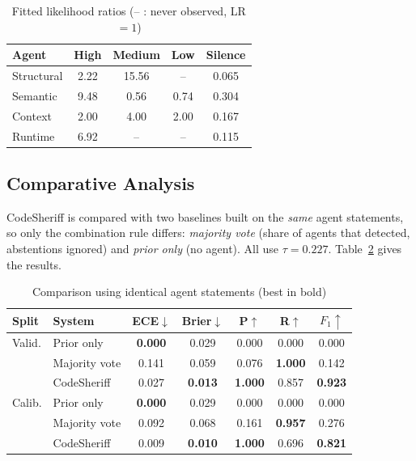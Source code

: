 \documentclass[conference]{IEEEtran}
\begin{document}
\begin{table}[t]
\centering
\caption{Fitted likelihood ratios (-- : never observed, LR $=1$)}
\label{tab:lr}
\small
\setlength{\tabcolsep}{5pt}
\begin{tabular}{lcccc}
\toprule
Agent & High & Medium & Low & Silence \\
\midrule
Structural & 2.22 & 15.56 & --   & 0.065 \\
Semantic   & 9.48 & 0.56  & 0.74 & 0.304 \\
Context    & 2.00 & 4.00  & 2.00 & 0.167 \\
Runtime    & 6.92 & --    & --   & 0.115 \\
\bottomrule
\end{tabular}
\end{table}

\subsection{Comparative Analysis}
CodeSheriff is compared with two baselines built on the \emph{same} agent
statements, so only the combination rule differs: \emph{majority vote}
(share of agents that detected, abstentions ignored) and \emph{prior only}
(no agent). All use $\tau=0.227$. Table~\ref{tab:comparison} gives the
results.

\begin{table}[t]
\centering
\caption{Comparison using identical agent statements (best in bold)}
\label{tab:comparison}
\small
\setlength{\tabcolsep}{3.2pt}
\begin{tabular}{llccccc}
\toprule
Split & System & ECE$\downarrow$ & Brier$\downarrow$ & P$\uparrow$ & R$\uparrow$ & $F_1\uparrow$ \\
\midrule
Valid. & Prior only    & \textbf{0.000} & 0.029 & 0.000 & 0.000 & 0.000 \\
       & Majority vote & 0.141 & 0.059 & 0.076 & \textbf{1.000} & 0.142 \\
       & CodeSheriff   & 0.027 & \textbf{0.013} & \textbf{1.000} & 0.857 & \textbf{0.923} \\
\midrule
Calib. & Prior only    & \textbf{0.000} & 0.029 & 0.000 & 0.000 & 0.000 \\
       & Majority vote & 0.092 & 0.068 & 0.161 & \textbf{0.957} & 0.276 \\
       & CodeSheriff   & 0.009 & \textbf{0.010} & \textbf{1.000} & 0.696 & \textbf{0.821} \\
\bottomrule
\end{tabular}
\end{table}
\end{document}
